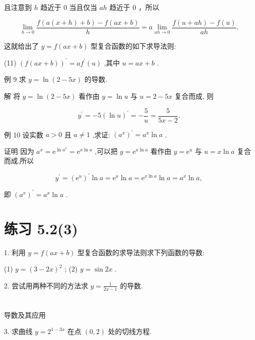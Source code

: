 \documentclass[10pt]{article}
\begin{document}
且注意到 \(h\) 趋近于 0 当且仅当 \({ah}\) 趋近于 0 ，所以

\[
\mathop{\lim }\limits_{{h \rightarrow  0}}\frac{f\left( {a\left( {x + h}\right)  + b}\right)  - f\left( {{ax} + b}\right) }{h} = a\mathop{\lim }\limits_{{{ah} \rightarrow  0}}\frac{f\left( {u + {ah}}\right)  - f\left( u\right) }{ah}.
\]

这就给出了 \(y = f\left( {{ax} + b}\right)\) 型复合函数的如下求导法则:

(11) \({\left( f\left( ax + b\right) \right) }^{\prime } = a{f}^{\prime }\left( u\right)\) ,其中 \(u = {ax} + b\) .

例 9 求 \(y = \ln \left( {2 - {5x}}\right)\) 的导数.

解 将 \(y = \ln \left( {2 - {5x}}\right)\) 看作由 \(y = \ln u\) 与 \(u = 2 - {5x}\) 复合而成, 则

\[
{y}^{\prime } =  - 5{\left( \ln u\right) }^{\prime } =  - \frac{5}{u} = \frac{5}{{5x} - 2}.
\]

例 10 设实数 \(a > 0\) 且 \(a \neq  1\) ,求证: \({\left( {a}^{x}\right) }^{\prime } = {a}^{x}\ln a\) .

证明 因为 \({a}^{x} = {\mathrm{e}}^{\ln {a}^{x}} = {\mathrm{e}}^{x\ln a}\) ,可以把 \(y = {\mathrm{e}}^{x\ln a}\) 看作由 \(y = {\mathrm{e}}^{u}\) 与 \(u = x\ln a\) 复合而成,所以

\[
{y}^{\prime } = {\left( {\mathrm{e}}^{u}\right) }^{\prime }\ln a = {\mathrm{e}}^{u}\ln a = {\mathrm{e}}^{x\ln a}\ln a = {a}^{x}\ln a,
\]

即 \({\left( {a}^{x}\right) }^{\prime } = {a}^{x}\ln a\) .

\section*{练习 5.2(3)}

1. 利用 \(y = f\left( {{ax} + b}\right)\) 型复合函数的求导法则求下列函数的导数:

(1) \(y = {\left( 3 - 2x\right) }^{2}\) ; (2) \(y = \sin {2x}\) .

2. 尝试用两种不同的方法求 \(y = \frac{1}{{2x} - 1}\) 的导数.



\section*{}

导数及其应用

3. 求曲线 \(y = {2}^{1 - {3x}}\) 在点 \(\left( {0,2}\right)\) 处的切线方程.
\end{document}
